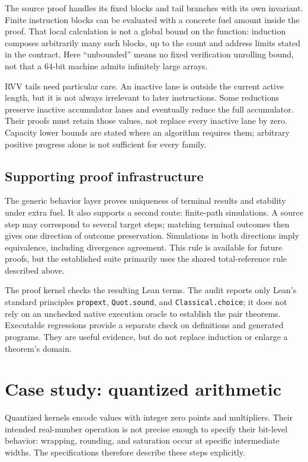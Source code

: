 \documentclass[11pt]{article}
\newcommand{\code}[1]{{\small\texttt{#1}}}
\begin{document}
The source proof handles its fixed blocks and tail branches with its own invariant. Finite instruction blocks can be evaluated with a concrete fuel amount inside the proof. That local calculation is not a global bound on the function: induction composes arbitrarily many such blocks, up to the count and address limits stated in the contract. Here ``unbounded'' means no fixed verification unrolling bound, not that a 64-bit machine admits infinitely large arrays.

RVV tails need particular care. An inactive lane is outside the current active length, but it is not always irrelevant to later instructions. Some reductions preserve inactive accumulator lanes and eventually reduce the full accumulator. Their proofs must retain those values, not replace every inactive lane by zero. Capacity lower bounds are stated where an algorithm requires them; arbitrary positive progress alone is not sufficient for every family.

\subsection{Supporting proof infrastructure}
The generic behavior layer proves uniqueness of terminal results and stability under extra fuel. It also supports a second route: finite-path simulations. A source step may correspond to several target steps; matching terminal outcomes then gives one direction of outcome preservation. Simulations in both directions imply equivalence, including divergence agreement. This rule is available for future proofs, but the established suite primarily uses the shared total-reference rule described above.

The proof kernel checks the resulting Lean terms. The audit reports only Lean's standard principles \code{propext}, \code{Quot.sound}, and \code{Classical.choice}; it does not rely on an unchecked native execution oracle to establish the pair theorems. Executable regressions provide a separate check on definitions and generated programs. They are useful evidence, but do not replace induction or enlarge a theorem's domain.

\section{Case study: quantized arithmetic}
Quantized kernels encode values with integer zero points and multipliers. Their intended real-number operation is not precise enough to specify their bit-level behavior: wrapping, rounding, and saturation occur at specific intermediate widths. The specifications therefore describe these steps explicitly.
\end{document}
